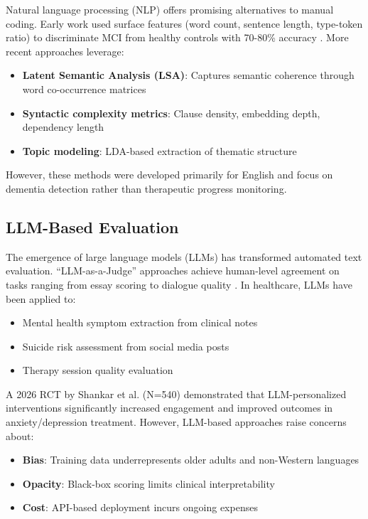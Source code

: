 \documentclass{article}
\begin{document}
Natural language processing (NLP) offers promising alternatives to manual coding. Early work used surface features (word count, sentence length, type-token ratio) to discriminate MCI from healthy controls with 70-80\% accuracy \cite{fraser2024}. More recent approaches leverage:

\begin{itemize}
    \item \textbf{Latent Semantic Analysis (LSA)}: Captures semantic coherence through word co-occurrence matrices \cite{bedi2025}
    \item \textbf{Syntactic complexity metrics}: Clause density, embedding depth, dependency length \cite{yan2025}
    \item \textbf{Topic modeling}: LDA-based extraction of thematic structure \cite{sankarasubramaniam2026}
\end{itemize}

However, these methods were developed primarily for English and focus on dementia detection rather than therapeutic progress monitoring.

\subsection{LLM-Based Evaluation}

The emergence of large language models (LLMs) has transformed automated text evaluation. ``LLM-as-a-Judge'' approaches achieve human-level agreement on tasks ranging from essay scoring \cite{zheng2025} to dialogue quality \cite{chiang2025}. In healthcare, LLMs have been applied to:
\begin{itemize}
    \item Mental health symptom extraction from clinical notes \cite{gkotsis2025}
    \item Suicide risk assessment from social media posts \cite{matero2025}
    \item Therapy session quality evaluation \cite{lee2026}
\end{itemize}

A 2026 RCT by Shankar et al. \cite{shankar2026} (N=540) demonstrated that LLM-personalized interventions significantly increased engagement and improved outcomes in anxiety/depression treatment. However, LLM-based approaches raise concerns about:
\begin{itemize}
    \item \textbf{Bias}: Training data underrepresents older adults and non-Western languages \cite{blodgett2025}
    \item \textbf{Opacity}: Black-box scoring limits clinical interpretability
    \item \textbf{Cost}: API-based deployment incurs ongoing expenses
\end{itemize}
\end{document}
